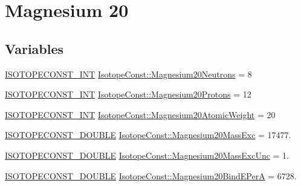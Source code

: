 \hypertarget{group___isotope_const-_magnesium-_mg20}{}\section{Magnesium 20}
\label{group___isotope_const-_magnesium-_mg20}
\subsection*{Variables}
\begin{DoxyCompactItemize}
\item 
\mbox{\hyperlink{group___isotope_const-_macros_ga5f18360b3e99483a35c32d789e62621c}{I\+S\+O\+T\+O\+P\+E\+C\+O\+N\+S\+T\+\_\+\+I\+NT}} \mbox{\hyperlink{group___isotope_const-_magnesium-_mg20_gafc51d43bbec4172683988ba111c0d4af}{Isotope\+Const\+::\+Magnesium20\+Neutrons}} = 8
\item 
\mbox{\hyperlink{group___isotope_const-_macros_ga5f18360b3e99483a35c32d789e62621c}{I\+S\+O\+T\+O\+P\+E\+C\+O\+N\+S\+T\+\_\+\+I\+NT}} \mbox{\hyperlink{group___isotope_const-_magnesium-_mg20_ga06e2ea4189915ca6e30d308e3b39f8e8}{Isotope\+Const\+::\+Magnesium20\+Protons}} = 12
\item 
\mbox{\hyperlink{group___isotope_const-_macros_ga5f18360b3e99483a35c32d789e62621c}{I\+S\+O\+T\+O\+P\+E\+C\+O\+N\+S\+T\+\_\+\+I\+NT}} \mbox{\hyperlink{group___isotope_const-_magnesium-_mg20_gab1ab8251d92f8e63bfaeffa2217439fb}{Isotope\+Const\+::\+Magnesium20\+Atomic\+Weight}} = 20
\item 
\mbox{\hyperlink{group___isotope_const-_macros_ga8f45a7272ce02c0b4c65c44636ed719a}{I\+S\+O\+T\+O\+P\+E\+C\+O\+N\+S\+T\+\_\+\+D\+O\+U\+B\+LE}} \mbox{\hyperlink{group___isotope_const-_magnesium-_mg20_gae3f075136fe1a834d931d8f02936c59a}{Isotope\+Const\+::\+Magnesium20\+Mass\+Exc}} = 17477.
\item 
\mbox{\hyperlink{group___isotope_const-_macros_ga8f45a7272ce02c0b4c65c44636ed719a}{I\+S\+O\+T\+O\+P\+E\+C\+O\+N\+S\+T\+\_\+\+D\+O\+U\+B\+LE}} \mbox{\hyperlink{group___isotope_const-_magnesium-_mg20_ga7f798a48a2250c4954141b77273059f9}{Isotope\+Const\+::\+Magnesium20\+Mass\+Exc\+Unc}} = 1.
\item 
\mbox{\hyperlink{group___isotope_const-_macros_ga8f45a7272ce02c0b4c65c44636ed719a}{I\+S\+O\+T\+O\+P\+E\+C\+O\+N\+S\+T\+\_\+\+D\+O\+U\+B\+LE}} \mbox{\hyperlink{group___isotope_const-_magnesium-_mg20_ga8028ba9cfd5a84c84f0e6357ab0b2e03}{Isotope\+Const\+::\+Magnesium20\+Bind\+E\+PerA}} = 6728.
\item 

\end{DoxyCompactItemize}
